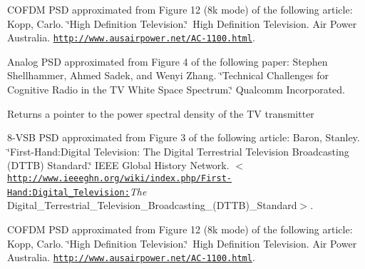 C\+O\+F\+DM P\+SD approximated from Figure 12 (8k mode) of the following article\+: Kopp, Carlo. \char`\"{}\+High Definition Television.\char`\"{} \+High Definition Television. Air Power Australia. \href{http://www.ausairpower.net/AC-1100.html}{\tt http\+://www.\+ausairpower.\+net/\+A\+C-\/1100.\+html}.

Analog P\+SD approximated from Figure 4 of the following paper\+: Stephen Shellhammer, Ahmed Sadek, and Wenyi Zhang. \char`\"{}\+Technical Challenges 
for Cognitive Radio in the T\+V White Space Spectrum.\char`\"{} Qualcomm Incorporated.

\begin{DoxyReturn}{Returns}
a pointer to the power spectral density of the TV transmitter
\end{DoxyReturn}
8-\/\+V\+SB P\+SD approximated from Figure 3 of the following article\+: Baron, Stanley. \char`\"{}\+First-\/\+Hand\+:\+Digital Television\+: The Digital Terrestrial 
\+Television Broadcasting (\+D\+T\+T\+B) Standard.\char`\"{} I\+E\+EE Global History Network. $<$\href{http://www.ieeeghn.org/wiki/index.php/First-Hand:Digital_Television:}{\tt http\+://www.\+ieeeghn.\+org/wiki/index.\+php/\+First-\/\+Hand\+:\+Digital\+\_\+\+Television\+:}{\itshape The} Digital\+\_\+\+Terrestrial\+\_\+\+Television\+\_\+\+Broadcasting\+\_\+(\+D\+T\+T\+B)\+\_\+\+Standard$>$.

C\+O\+F\+DM P\+SD approximated from Figure 12 (8k mode) of the following article\+: Kopp, Carlo. \char`\"{}\+High Definition Television.\char`\"{} \+High Definition Television. Air Power Australia. \href{http://www.ausairpower.net/AC-1100.html}{\tt http\+://www.\+ausairpower.\+net/\+A\+C-\/1100.\+html}.

